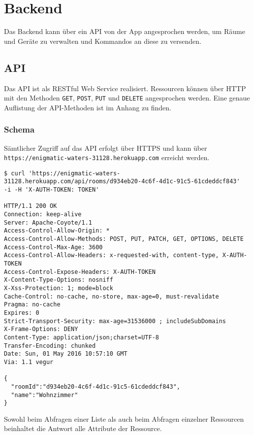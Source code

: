 \section{Backend}
Das Backend kann über ein API von der App angesprochen werden, um Räume und Geräte zu verwalten und Kommandos an diese zu versenden.

\subsection{API}
Das API ist als RESTful Web Service realisiert. Ressourcen können über HTTP mit den Methoden \colorbox{pregray}{\lstinline{GET}}, \colorbox{pregray}{\lstinline{POST}}, \colorbox{pregray}{\lstinline{PUT}} und \colorbox{pregray}{\lstinline{DELETE}} angesprochen werden. Eine genaue Auflistung der API-Methoden ist im Anhang zu finden.

\subsubsection{Schema}
Sämtlicher Zugriff auf das API erfolgt über HTTPS und kann über \colorbox{pregray}{\lstinline{https://enigmatic-waters-31128.herokuapp.com}} erreicht werden.

\vspace{2em}
\begin{lstlisting}
$ curl 'https://enigmatic-waters-31128.herokuapp.com/api/rooms/d934eb20-4c6f-4d1c-91c5-61cdeddcf843' 
-i -H 'X-AUTH-TOKEN: TOKEN'

HTTP/1.1 200 OK
Connection: keep-alive
Server: Apache-Coyote/1.1
Access-Control-Allow-Origin: *
Access-Control-Allow-Methods: POST, PUT, PATCH, GET, OPTIONS, DELETE
Access-Control-Max-Age: 3600
Access-Control-Allow-Headers: x-requested-with, content-type, X-AUTH-TOKEN
Access-Control-Expose-Headers: X-AUTH-TOKEN
X-Content-Type-Options: nosniff
X-Xss-Protection: 1; mode=block
Cache-Control: no-cache, no-store, max-age=0, must-revalidate
Pragma: no-cache
Expires: 0
Strict-Transport-Security: max-age=31536000 ; includeSubDomains
X-Frame-Options: DENY
Content-Type: application/json;charset=UTF-8
Transfer-Encoding: chunked
Date: Sun, 01 May 2016 10:57:10 GMT
Via: 1.1 vegur

{
  "roomId":"d934eb20-4c6f-4d1c-91c5-61cdeddcf843",
  "name":"Wohnzimmer"
}
\end{lstlisting}
\vspace{2em}

Sowohl beim Abfragen einer Liste als auch beim Abfragen einzelner Ressourcen beinhaltet die Antwort alle Attribute der Ressource.

